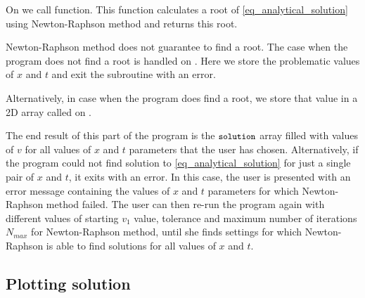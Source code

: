 On  we call  function. This function calculates a root of \autoref{eq_analytical_solution} using Newton-Raphson method and returns this root.

Newton-Raphson method does not guarantee to find a root. The case when the program does not find a root is handled on . Here we store the problematic values of $x$ and $t$ and exit the subroutine with an error.

Alternatively, in case when the program does find a root, we store that value in a 2D array called  on .

The end result of this part of the program is the $\texttt{\small solution}$ array filled with values of $v$ for all values of $x$ and $t$ parameters that the user has chosen. Alternatively, if the program could not find solution to \autoref{eq_analytical_solution} for just a single pair of $x$ and $t$, it exits with an error. In this case, the user is presented with an error message containing the values of $x$ and $t$ parameters for which Newton-Raphson method failed. The user can then re-run the program again with different values of starting $v_1$ value, tolerance and maximum number of iterations $N_{max}$ for Newton-Raphson method, until she finds settings for which Newton-Raphson is able to find solutions for all values of $x$ and $t$.



\subsection{Plotting solution}

